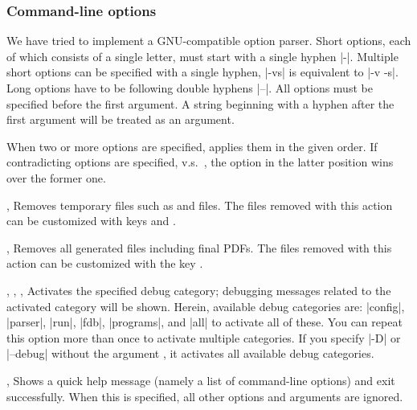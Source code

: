 \documentclass{llmk-doc}
\begin{document}
\subsubsection*{Command-line options }
\enlargethispage{5mm}%

We have tried to implement a GNU-compatible option parser. Short options, each of
which consists of a single letter, must start with a single hyphen |-|.
Multiple short options can be specified with a single hyphen, \eg |-vs| is
equivalent to |-v -s|. Long options have to be following double hyphens |--|.
All options must be specified before the first argument. A string beginning
with a hyphen after the first argument will be treated as an argument.

When two or more options are specified,  applies them in the given
order. If contradicting options are specified, \eg {} v.s.\ , the
option in the latter position wins over the former one.

\begin{clopt}{, }
Removes temporary files such as  and  files. The files
removed with this action can be customized with keys  and
.
\end{clopt}

\begin{clopt}{, }
Removes all generated files including final PDFs. The files removed with this
action can be customized with the key .
\end{clopt}

\begin{clopt}{%
  , ,
  , }
Activates the specified debug category; debugging messages related to the
activated category will be shown. Herein, available debug categories are:
|config|, |parser|, |run|, |fdb|, |programs|, and |all| to activate all of
these. You can repeat this option more than once to activate multiple
categories. If you specify |-D| or |--debug| without the argument
, it activates all available debug categories.
\end{clopt}

\begin{clopt}{, }
Shows a quick help message (namely a list of command-line options) and exit
successfully. When this is specified, all other options and arguments are
ignored.
\end{clopt}
\end{document}
